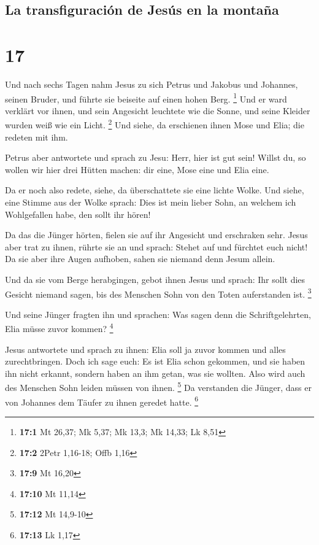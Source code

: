 \hypertarget{la-transfiguraciuxf3n-de-jesuxfas-en-la-montauxf1a}{%
\subsection{La transfiguración de Jesús en la
montaña}\label{la-transfiguraciuxf3n-de-jesuxfas-en-la-montauxf1a}}

\hypertarget{section-16}{%
\section{17}\label{section-16}}

 Und nach sechs Tagen nahm Jesus zu sich Petrus und
Jakobus und Johannes, seinen Bruder, und führte sie beiseite auf einen
hohen Berg. \footnote{\textbf{17:1} Mt 26,37; Mk 5,37; Mk 13,3; Mk
  14,33; Lk 8,51}  Und er ward verklärt vor ihnen, und
sein Angesicht leuchtete wie die Sonne, und seine Kleider wurden weiß
wie ein Licht. \footnote{\textbf{17:2} 2Petr 1,16-18; Offb 1,16}
 Und siehe, da erschienen ihnen Mose und Elia; die redeten
mit ihm.

 Petrus aber antwortete und sprach zu Jesu: Herr, hier ist
gut sein! Willst du, so wollen wir hier drei Hütten machen: dir eine,
Mose eine und Elia eine.

 Da er noch also redete, siehe, da überschattete sie eine
lichte Wolke. Und siehe, eine Stimme aus der Wolke sprach: Dies ist mein
lieber Sohn, an welchem ich Wohlgefallen habe, den sollt ihr hören!

 Da das die Jünger hörten, fielen sie auf ihr Angesicht
und erschraken sehr.  Jesus aber trat zu ihnen, rührte sie
an und sprach: Stehet auf und fürchtet euch nicht!  Da sie
aber ihre Augen aufhoben, sahen sie niemand denn Jesum allein.

 Und da sie vom Berge herabgingen, gebot ihnen Jesus und
sprach: Ihr sollt dies Gesicht niemand sagen, bis des Menschen Sohn von
den Toten auferstanden ist. \footnote{\textbf{17:9} Mt 16,20}

 Und seine Jünger fragten ihn und sprachen: Was sagen
denn die Schriftgelehrten, Elia müsse zuvor kommen? \footnote{\textbf{17:10}
  Mt 11,14}

 Jesus antwortete und sprach zu ihnen: Elia soll ja zuvor
kommen und alles zurechtbringen.  Doch ich sage euch: Es
ist Elia schon gekommen, und sie haben ihn nicht erkannt, sondern haben
an ihm getan, was sie wollten. Also wird auch des Menschen Sohn leiden
müssen von ihnen. \footnote{\textbf{17:12} Mt 14,9-10} 
Da verstanden die Jünger, dass er von Johannes dem Täufer zu ihnen
geredet hatte. \footnote{\textbf{17:13} Lk 1,17}

